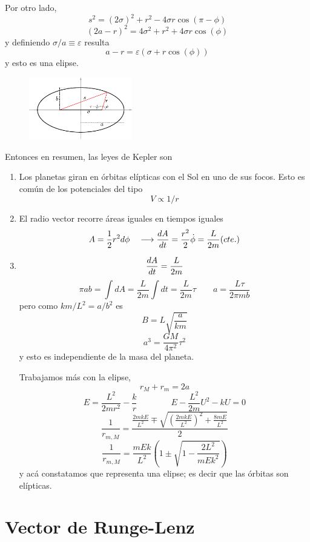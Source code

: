 \documentclass[10pt,oneside]{CBFT_book}
\begin{document}
Por otro lado,
\[
	s^2 = (2\sigma)^2 + r^2 - 4\sigma r \cos( \pi - \phi )
\]
\[
	( 2a -r )^2 = 4\sigma^2 + r^2 + 4\sigma r \cos(\phi)
\]
y definiendo $ \sigma/a \equiv \varepsilon$ resulta
\[
	a - r = \varepsilon ( \sigma + r\cos(\phi) )
\]
y esto es una elipse.
\begin{figure}[hbt]
	\begin{center}
	\includegraphics[width=0.4\textwidth]{images/fig_mc_elipse.pdf}	 
	\end{center}
	\caption{}
\end{figure} 

Entonces en resumen, las leyes de Kepler son
\begin{enumerate}
 \item Los planetas giran en órbitas elípticas con el Sol en uno de sus focos. Esto es común de los potenciales del tipo 
	\[
		V \propto 1/r
	\]
 \item El radio vector recorre áreas iguales en tiempos iguales
	\[
		A = \frac{1}{2} r^2 d\phi \quad \longrightarrow \frac{d^{\hspace{-0.05em}} {A}}{d {t}^{\hspace{-0.05em}}} = \frac{r^2}{2} \dot{\phi} = \frac{L}{2m} (cte.)
	\]
 \item 
 \[
	\frac{d^{\hspace{-0.05em}} {A}}{d {t}^{\hspace{-0.05em}}} = \frac{L}{2m}
 \]
 \[
	\pi a b = \int dA = \frac{L}{2m} \int dt = \frac{L}{2m} \tau \qquad a = \frac{L\tau}{2\pi m b} 
 \]
 pero como $km/L^2 = a/b^2$ es
 \[
	B = L \sqrt{\frac{a}{k m}}
 \]
 \[
	a^3 = \frac{GM}{4\pi^2} \tau^2
 \]
 y esto es independiente de la masa del planeta.
 
 Trabajamos más con la elipse,
 \[
	r_M + r_m = 2a
 \]
 \[
	E = \frac{L^2}{2mr^2} - \frac{k}{r}	\qquad\qquad E - \frac{L^2}{2m} U^2 - kU = 0
 \]
 \[
	\frac{1}{r_{m,M}} = \frac{ \frac{2mkE}{L^2} \mp \sqrt{ \left(\frac{2mkE}{L^2}\right)^2 + \frac{8mE}{L^2} } }{2}
 \]
 \[
	\frac{1}{r_{m,M}} = \frac{mEk}{L^2} \left( 1 \pm \sqrt{1 - \frac{2L^2}{mEk^2}}\right) 
 \]
 y acá constatamos que representa una elipse; es decir que las órbitas son elípticas.
\end{enumerate}

\section{Vector de Runge-Lenz}
\end{document}
